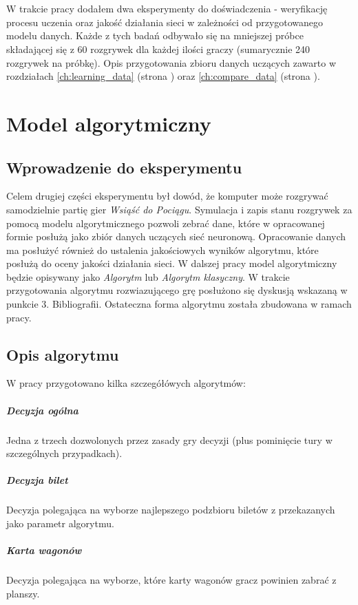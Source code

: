 \documentclass[12pt, oneside]{report}
\begin{document}
	\\ \\ 
	W trakcie pracy dodałem dwa eksperymenty do doświadczenia - weryfikację procesu uczenia oraz jakość działania sieci w zależności od przygotowanego modelu danych. Każde z tych badań odbywało się na mniejszej próbce składającej się z 60 rozgrywek dla każdej ilości graczy (sumarycznie 240 rozgrywek na próbkę). Opis przygotowania zbioru danych uczących zawarto w rozdziałach \ref{ch:learning_data} (strona \pageref{ch:learning_data}) oraz \ref{ch:compare_data} (strona \pageref{ch:compare_data}).
	
	\chapter{Model algorytmiczny}
	\label{model:algo}
	\section{Wprowadzenie do eksperymentu}
	Celem drugiej części eksperymentu był dowód, że komputer może rozgrywać samodzielnie partię gier \textit{Wsiąść do Pociągu}. Symulacja i zapis stanu rozgrywek za pomocą modelu algorytmicznego pozwoli zebrać dane, które w opracowanej formie posłużą jako zbiór danych uczących sieć neuronową. Opracowanie danych ma posłużyć również do ustalenia jakościowych wyników algorytmu, które posłużą do oceny jakości działania sieci. W dalszej pracy model algorytmiczny będzie opisywany jako \textit{Algorytm} lub \textit{Algorytm klasyczny}. W trakcie przygotowania algorytmu rozwiazującego grę posłużono się dyskusją wskazaną w punkcie 3. Bibliografii. Ostateczna forma algorytmu została zbudowana w ramach pracy.
	\section{Opis algorytmu}
	W pracy przygotowano kilka szczegółówych algorytmów:
	\paragraph{Decyzja ogólna} Jedna z trzech dozwolonych przez zasady gry decyzji (plus pominięcie tury w szczególnych przypadkach).
	\paragraph{Decyzja bilet} Decyzja polegająca na wyborze najlepszego podzbioru biletów z przekazanych jako parametr algorytmu.
	\paragraph{Karta wagonów} Decyzja polegająca na wyborze, które karty wagonów gracz powinien zabrać z planszy.
\end{document}
